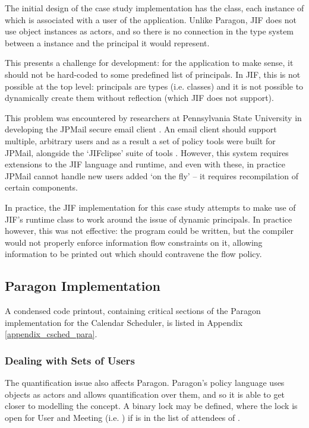 The initial design of the case study implementation has the  class, each instance of which is associated with a user of the application. Unlike Paragon, JIF does not use object instances as actors, and so there is no connection in the type system between a  instance and the principal it would represent.

This presents a challenge for development: for the application to make sense, it should not be hard-coded to some predefined list of principals. In JIF, this is not possible at the top level: principals are types (i.e. classes) and it is not possible to dynamically create them without reflection (which JIF does not support).

This problem was encountered by researchers at Pennsylvania State University in developing the JPMail secure email client \cite{jpmailpage}. An email client should support multiple, arbitrary users and as a result a set of policy tools were built for JPMail, alongside the `JIFclipse' suite of tools \cite{hicks2007jifclipse}. However, this system requires extensions to the JIF language and runtime, and even with these, in practice JPMail cannot handle new users added `on the fly' -- it requires recompilation of certain components.

In practice, the JIF implementation for this case study attempts to make use of JIF's runtime  class to work around the issue of dynamic principals. In practice however, this was not effective: the program could be written, but the compiler would not properly enforce information flow constraints on it, allowing information to be printed out which should contravene the flow policy.

\subsection{Paragon Implementation}

A condensed code printout, containing critical sections of the Paragon implementation for the Calendar Scheduler, is listed in Appendix \ref{appendix_csched_para}.

\subsubsection{Dealing with Sets of Users}

The quantification issue also affects Paragon. Paragon's policy language uses objects as actors and allows quantification over them, and so it is able to get closer to modelling the concept. A binary lock  may be defined, where the lock is open for User  and Meeting  (i.e. ) if  is in the list of attendees of .

